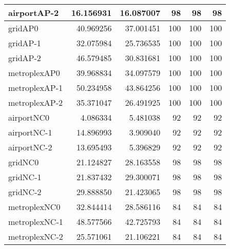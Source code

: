 \begin{longtable}{|l|r|r|r|r|r|}
airportAP-2 & 16.156931 & 16.087007 & 98 & 98 & 98 \\ \hline
gridAP0 & 40.969256 & 37.001451 & 100 & 100 & 100 \\ \hline
gridAP-1 & 32.075984 & 25.736535 & 100 & 100 & 100 \\ \hline
gridAP-2 & 46.579485 & 30.831681 & 100 & 100 & 100 \\ \hline
metroplexAP0 & 39.968834 & 34.097579 & 100 & 100 & 100 \\ \hline
metroplexAP-1 & 50.234958 & 43.864256 & 100 & 100 & 100 \\ \hline
metroplexAP-2 & 35.371047 & 26.491925 & 100 & 100 & 100 \\ \hline
airportNC0 & 4.086334 & 5.481038 & 92 & 92 & 92 \\ \hline
airportNC-1 & 14.896993 & 3.909040 & 92 & 92 & 92 \\ \hline
airportNC-2 & 13.695493 & 5.396829 & 92 & 92 & 92 \\ \hline
gridNC0 & 21.124827 & 28.163558 & 98 & 98 & 98 \\ \hline
gridNC-1 & 21.837432 & 29.300071 & 98 & 98 & 98 \\ \hline
gridNC-2 & 29.888850 & 21.423065 & 98 & 98 & 98 \\ \hline
metroplexNC0 & 32.844414 & 28.586116 & 84 & 84 & 84 \\ \hline
metroplexNC-1 & 48.577566 & 42.725793 & 84 & 84 & 84 \\ \hline
metroplexNC-2 & 25.571061 & 21.106221 & 84 & 84 & 84 \\ \hline
\end{longtable}
